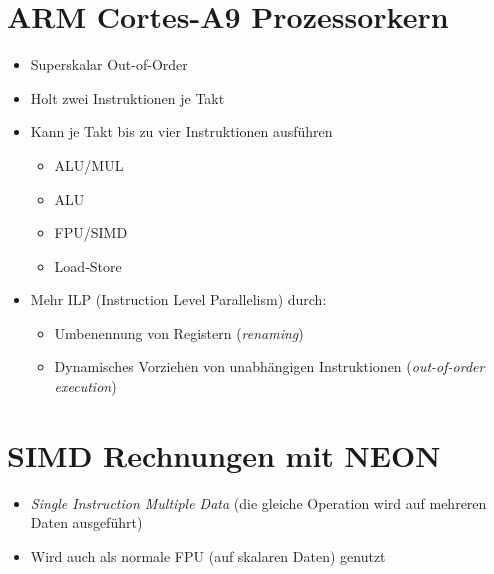 \documentclass[a4paper, 11pt, accentcolor = tud3b]{tudreport}
\begin{document}
		\section{ARM Cortes-A9 Prozessorkern}
			\begin{itemize}
				\item Superskalar Out-of-Order
				\item Holt zwei Instruktionen je Takt
				\item Kann je Takt bis zu vier Instruktionen ausführen
					\begin{itemize}
						\item ALU/MUL
						\item ALU
						\item FPU/SIMD
						\item Load-Store
					\end{itemize}
				\item Mehr ILP (Instruction Level Parallelism) durch:
					\begin{itemize}
						\item Umbenennung von Registern (\textit{renaming})
						\item Dynamisches Vorziehen von unabhängigen Instruktionen (\textit{out-of-order execution})
					\end{itemize}
			\end{itemize}
		
		\section{SIMD Rechnungen mit NEON}
			\begin{itemize}
				\item \textit{Single Instruction Multiple Data} (die gleiche Operation wird auf mehreren Daten ausgeführt)
				\item Wird auch als normale FPU (auf skalaren Daten) genutzt
			\end{itemize}
		
\end{document}
